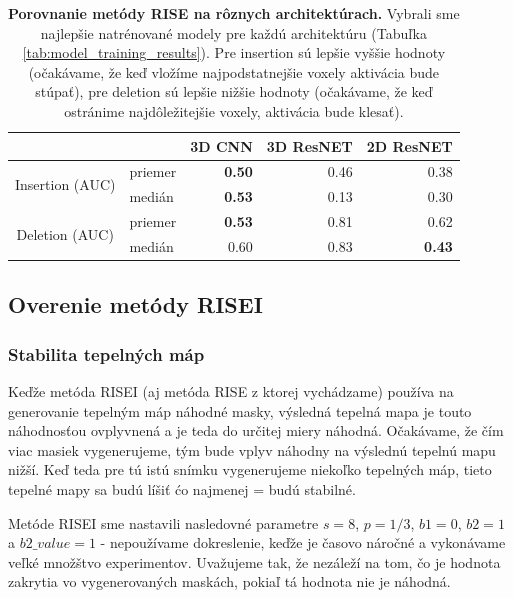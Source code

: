 \begin{table}[]
    \centering
    \begin{tabular}{cl|r|r|r|}
        \cline{3-5}
        \multicolumn{1}{l}{} &  & \multicolumn{1}{c|}{3D CNN} & \multicolumn{1}{c|}{3D ResNET} & \multicolumn{1}{c|}{2D ResNET} \\ \hline
        \multicolumn{1}{|c|}{\multirow{2}{*}{Insertion (AUC)}} & priemer & \textbf{0.50} & 0.46 & 0.38 \\ \cline{2-2}
        \multicolumn{1}{|c|}{}                                 & medián  & \textbf{0.53} & 0.13 & 0.30 \\ \cline{1-2}
        \multicolumn{1}{|c|}{\multirow{2}{*}{Deletion (AUC)}}  & priemer & \textbf{0.53} & 0.81 & 0.62 \\ \cline{2-2}
        \multicolumn{1}{|c|}{}                                 & medián  & 0.60 & 0.83 & \textbf{0.43} \\ \hline
    \end{tabular}
    \caption{\textbf{Porovnanie metódy RISE na rôznych architektúrach.} Vybrali sme najlepšie natrénované modely pre každú architektúru (Tabuľka \ref{tab:model_training_results}). Pre insertion sú lepšie vyššie hodnoty (očakávame, že keď vložíme najpodstatnejšie voxely aktivácia bude stúpať), pre deletion sú lepšie nižšie hodnoty (očakávame, že keď ostránime najdôležitejšie voxely, aktivácia bude klesať).}
    \label{tab:experiment_rise_various_architectures}
\end{table}

\subsection{Overenie metódy RISEI}

\subsubsection{Stabilita tepelných máp}

Keďže metóda RISEI (aj metóda RISE z ktorej vychádzame) používa na generovanie tepelným máp náhodné masky, výsledná tepelná mapa je touto náhodnosťou ovplyvnená a je teda do určitej miery náhodná. Očakávame, že čím viac masiek vygenerujeme, tým bude vplyv náhodny na výslednú tepelnú mapu nižší. Keď teda pre tú istú snímku vygenerujeme niekoľko tepelných máp, tieto tepelné mapy sa budú líšiť ćo najmenej = budú stabilné.

Metóde RISEI sme nastavili nasledovné parametre $s = 8$, $p = 1/3$, $b1 = 0$, $b2 = 1$ a $b2\_value = 1$ - nepoužívame dokreslenie, keďže je časovo náročné a vykonávame veľké množštvo experimentov. Uvažujeme tak, že nezáleží na tom, čo je hodnota zakrytia vo vygenerovaných maskách, pokiaľ tá hodnota nie je náhodná.

